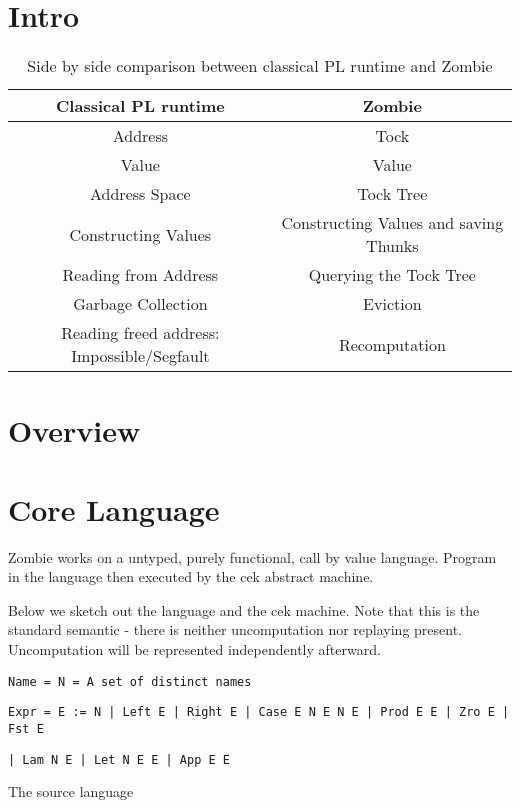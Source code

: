 \documentclass[acmsmall]{acmart}
\begin{document}
	\section{Intro}
		\begin{table}
		\begin{center}
			\begin{tabular}{ |c|c| } 
				\hline
				Classical PL runtime & Zombie \\ 
				\hline\hline
				Address & Tock \\
				Value & Value \\
				Address Space & Tock Tree \\
				Constructing Values & Constructing Values and saving Thunks \\
				Reading from Address & Querying the Tock Tree \\
				Garbage Collection & Eviction \\
				Reading freed address: Impossible/Segfault & Recomputation \\
				\hline
			\end{tabular}
			\caption{Side by side comparison between classical PL runtime and Zombie}
		\end{center}
	\end{table}
	\section{Overview}	
	\section{Core Language}	
	Zombie works on a untyped, purely functional, call by value language. Program in the language then executed by the cek abstract machine.
	
	Below we sketch out the language and the cek machine. Note that this is the standard semantic - there is neither uncomputation nor replaying present. Uncomputation will be represented independently afterward.

	\begin{mdframed}
	\texttt{Name = N = A set of distinct names}
		
	\texttt{Expr = E := N | Left E | Right E | Case E N E N E | Prod E E | Zro E | Fst E}

	\texttt{| Lam N E | Let N E E | App E E}

	The source language
	\end{mdframed}
	
\end{document}
